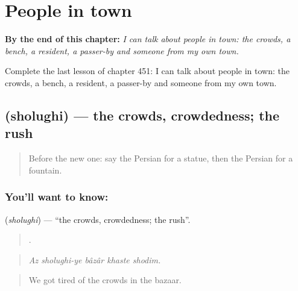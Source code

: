 
\chapter{People in town}
\label{ch:fa-people-in-town}

\begin{chapteropening}
\textbf{By the end of this chapter:} \emph{I can talk about people in town: the crowds, a bench, a resident, a passer-by and someone from my own town.}

Complete the last lesson of chapter 451: I can talk about people in town: the crowds, a bench, a resident, a passer-by and someone from my own town.
\end{chapteropening}

\section[\texorpdfstring{\fa{شلوغی} (sholughi)}{شلوغی (sholughi)}]{ (sholughi) — the crowds, crowdedness; the rush}

\label{lesson:FA-C451-sholughi}



\begin{quote}
Before the new one: say the Persian for a statue, then the Persian for a fountain.
\end{quote}

\subsection*{You'll want to know: }
\textbf{} (\emph{sholughi}) — \textquotedblleft{}the crowds, crowdedness; the rush\textquotedblright{}.

\begin{quote}
    .
\end{quote}

\begin{quote}
\emph{Az sholughi-ye bâzâr khaste shodim.}
\end{quote}

\begin{quote}
We got tired of the crowds in the bazaar.
\end{quote}

